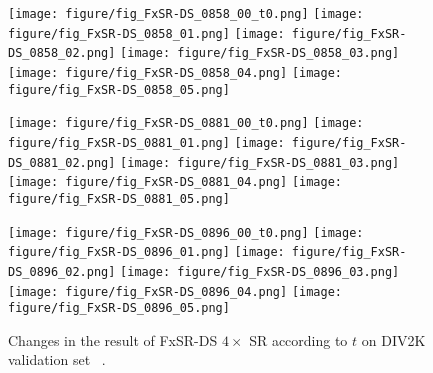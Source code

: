 \documentclass{article}
\begin{document}
\begin{figure*}[!t]
\begin{minipage}[t]{1.0\linewidth}
    \texttt{[image: figure/fig\_FxSR-DS\_0858\_00\_t0.png]}\hfill
    \texttt{[image: figure/fig\_FxSR-DS\_0858\_01.png]}\hfill
    \texttt{[image: figure/fig\_FxSR-DS\_0858\_02.png]}\hfill
    \texttt{[image: figure/fig\_FxSR-DS\_0858\_03.png]}\hfill
    \texttt{[image: figure/fig\_FxSR-DS\_0858\_04.png]}\hfill
    \texttt{[image: figure/fig\_FxSR-DS\_0858\_05.png]}\vfill
    \vspace{0.3cm}



    \texttt{[image: figure/fig\_FxSR-DS\_0881\_00\_t0.png]}\hfill
    \texttt{[image: figure/fig\_FxSR-DS\_0881\_01.png]}\hfill
    \texttt{[image: figure/fig\_FxSR-DS\_0881\_02.png]}\hfill
    \texttt{[image: figure/fig\_FxSR-DS\_0881\_03.png]}\hfill
    \texttt{[image: figure/fig\_FxSR-DS\_0881\_04.png]}\hfill
    \texttt{[image: figure/fig\_FxSR-DS\_0881\_05.png]}\vfill
    \vspace{0.3cm}



    \texttt{[image: figure/fig\_FxSR-DS\_0896\_00\_t0.png]}\hfill
    \texttt{[image: figure/fig\_FxSR-DS\_0896\_01.png]}\hfill
    \texttt{[image: figure/fig\_FxSR-DS\_0896\_02.png]}\hfill
    \texttt{[image: figure/fig\_FxSR-DS\_0896\_03.png]}\hfill
    \texttt{[image: figure/fig\_FxSR-DS\_0896\_04.png]}\hfill
    \texttt{[image: figure/fig\_FxSR-DS\_0896\_05.png]}\vfill
\end{minipage}
\caption{Changes in the result of FxSR-DS $4\times$ SR according to $t$ on DIV2K validation set~\cite{agustsson2017ntire} .}
\label{fig:fig_FxSR-DS_t}
\end{figure*}
\end{document}
